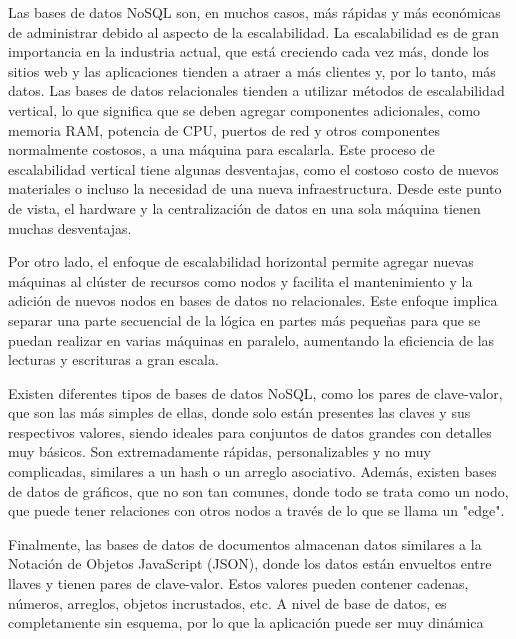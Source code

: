 Las bases de datos NoSQL son, en muchos casos, más rápidas y más económicas de administrar debido al aspecto de la escalabilidad. La escalabilidad es de gran importancia en la industria actual, que está creciendo cada vez más, donde los sitios web y las aplicaciones tienden a atraer a más clientes y, por lo tanto, más datos. Las bases de datos relacionales tienden a utilizar métodos de escalabilidad vertical, lo que significa que se deben agregar componentes adicionales, como memoria RAM, potencia de CPU, puertos de red y otros componentes normalmente costosos, a una máquina para escalarla. Este proceso de escalabilidad vertical tiene algunas desventajas, como el costoso costo de nuevos materiales o incluso la necesidad de una nueva infraestructura. Desde este punto de vista, el hardware y la centralización de datos en una sola máquina tienen muchas desventajas.


Por otro lado, el enfoque de escalabilidad horizontal permite agregar nuevas máquinas al clúster de recursos como nodos y facilita el mantenimiento y la adición de nuevos nodos en bases de datos no relacionales. Este enfoque implica separar una parte secuencial de la lógica en partes más pequeñas para que se puedan realizar en varias máquinas en paralelo, aumentando la eficiencia de las lecturas y escrituras a gran escala.

Existen diferentes tipos de bases de datos NoSQL, como los pares de clave-valor, que son las más simples de ellas, donde solo están presentes las claves y sus respectivos valores, siendo ideales para conjuntos de datos grandes con detalles muy básicos. Son extremadamente rápidas, personalizables y no muy complicadas, similares a un hash o un arreglo asociativo. Además, existen bases de datos de gráficos, que no son tan comunes, donde todo se trata como un nodo, que puede tener relaciones con otros nodos a través de lo que se llama un "edge".

Finalmente, las bases de datos de documentos almacenan datos similares a la Notación de Objetos JavaScript (JSON), donde los datos están envueltos entre llaves y tienen pares de clave-valor. Estos valores pueden contener cadenas, números, arreglos, objetos incrustados, etc. A nivel de base de datos, es completamente sin esquema, por lo que la aplicación puede ser muy dinámica


